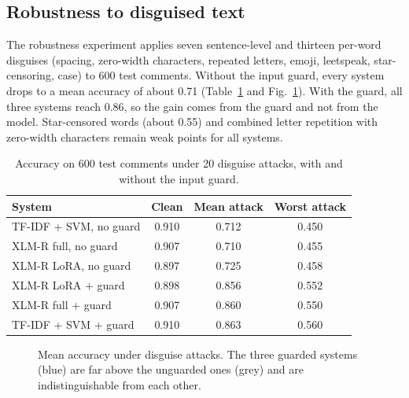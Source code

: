 \documentclass[conference]{IEEEtran}
\begin{document}
\subsection{Robustness to disguised text}
The robustness experiment applies seven sentence-level and thirteen per-word disguises (spacing, zero-width characters, repeated letters, emoji, leetspeak, star-censoring, case) to 600 test comments. Without the input guard, every system drops to a mean accuracy of about 0.71 (Table~\ref{tab:rob} and Fig.~\ref{fig:rob}). With the guard, all three systems reach 0.86, so the gain comes from the guard and not from the model. Star-censored words (about 0.55) and combined letter repetition with zero-width characters remain weak points for all systems.

\begin{table}[t]
\caption{Accuracy on 600 test comments under 20 disguise attacks, with and without the input guard.}
\label{tab:rob}
\centering
\footnotesize
\setlength{\tabcolsep}{4pt}
\begin{tabular}{lccc}
\toprule
System & Clean & Mean attack & Worst attack \\
\midrule
TF-IDF + SVM, no guard & 0.910 & 0.712 & 0.450 \\
XLM-R full, no guard & 0.907 & 0.710 & 0.455 \\
XLM-R LoRA, no guard & 0.897 & 0.725 & 0.458 \\
XLM-R LoRA + guard & 0.898 & 0.856 & 0.552 \\
XLM-R full + guard & 0.907 & 0.860 & 0.550 \\
TF-IDF + SVM + guard & 0.910 & 0.863 & 0.560 \\
\bottomrule
\end{tabular}
\end{table}

\begin{figure}[t]
\centering
{}
\caption{Mean accuracy under disguise attacks. The three guarded systems (blue) are far above the unguarded ones (grey) and are indistinguishable from each other.}
\label{fig:rob}
\end{figure}
\end{document}
